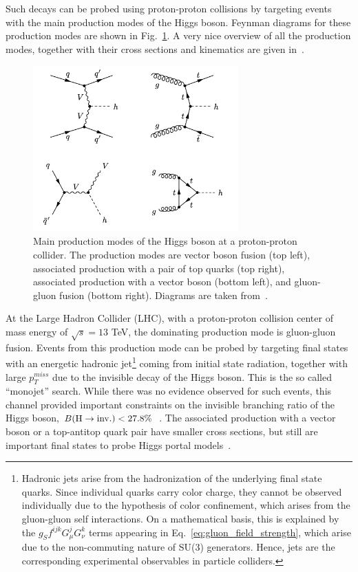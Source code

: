 Such decays can be probed using proton-proton collisions by targeting events with the main production modes of the Higgs boson. Feynman diagrams for these production 
modes are shown in Fig.~\ref{fig:all_higgs_prod}. A very nice overview of all the production modes, 
together with their cross sections and kinematics are given in~\cite{Djouadi:2005gi}.

\begin{figure}
    \centering
    \includegraphics[width=0.7\textwidth]{all_higgs_prod.png}    
    \caption{Main production modes of the Higgs boson at a proton-proton collider. The production modes are vector boson fusion (top left), associated production with
    a pair of top quarks (top right), associated production with a vector boson (bottom left), and gluon-gluon fusion (bottom right). Diagrams are taken from~\cite{Argyropoulos:2021sav}.}
    \label{fig:all_higgs_prod}
\end{figure}

At the Large Hadron Collider (LHC), with a proton-proton collision center of mass energy of $\sqrt{s} = 13$ TeV, the dominating production mode is gluon-gluon fusion. Events from 
this production mode can be probed by targeting final states with an energetic hadronic jet\footnote{Hadronic jets arise from the hadronization of the
underlying final state quarks. Since individual quarks carry color charge, they cannot be observed individually due to the hypothesis of color confinement,
which arises from the gluon-gluon self interactions. On a mathematical basis, this is explained by the $g_{S} f^{ijk} G_{\mu}^{j} G_{\nu}^{k}$ terms appearing in 
Eq.~\ref{eq:gluon_field_strength}, which arise due to the non-commuting nature of SU(3) generators. Hence, jets are the corresponding 
experimental observables in particle colliders.} 
coming from initial state radiation, together with large $p_T^{miss}$ due to the invisible decay
of the Higgs boson. This is the so called ``monojet'' search. While there was no evidence observed for such events, this channel provided important constraints on the invisible
branching ratio of the Higgs boson, $B(\textrm{H} \rightarrow \textrm{inv.}) < 27.8\%$~\cite{CMS:2021far}. The associated production with a vector boson or a top-antitop quark pair have smaller cross sections,
but still are important final states to probe Higgs portal models~\cite{CMS:2023sdw}.

